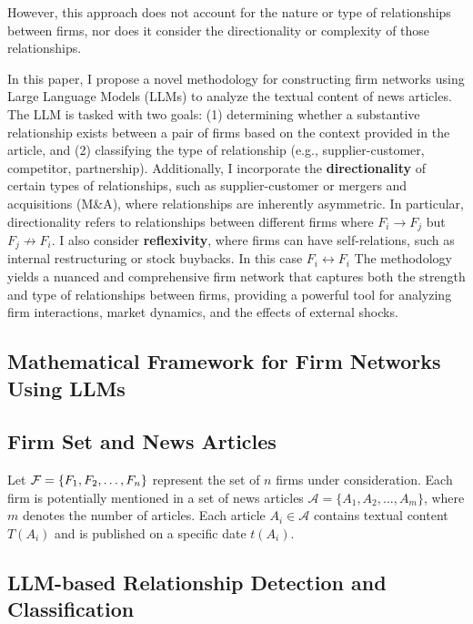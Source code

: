However, this approach does not account for the nature or type of relationships between firms, nor does it consider the directionality or complexity of those relationships.

In this paper, I propose a novel methodology for constructing firm networks using Large Language Models (LLMs) to analyze the textual content of news articles. The LLM is tasked with two goals: (1) determining whether a substantive relationship exists between a pair of firms based on the context provided in the article, and (2) classifying the type of relationship (e.g., supplier-customer, competitor, partnership). Additionally, I incorporate the \textbf{directionality} of certain types of relationships, such as supplier-customer or mergers and acquisitions (M\&A), where relationships are inherently asymmetric. In particular, directionality refers to relationships between different firms where $F_i \rightarrow F_j$ but $F_j \not \rightarrow F_i$. I also consider \textbf{reflexivity}, where firms can have self-relations, such as internal restructuring or stock buybacks. In this case $F_i \leftrightarrow F_i$
The methodology yields a nuanced and comprehensive firm network that captures both the strength and type of relationships between firms, providing a powerful tool for analyzing firm interactions, market dynamics, and the effects of external shocks.

\subsection{Mathematical Framework for Firm Networks Using LLMs}

\subsection{Firm Set and News Articles}

Let $ \mathcal{F} = \{F_1, F_2, \dots, F_n\} $ represent the set of $ n $ firms under consideration. Each firm is potentially mentioned in a set of news articles $ \mathcal{A} = \{A_1, A_2, \dots, A_m\} $, where $ m $ denotes the number of articles. Each article $ A_i \in \mathcal{A} $ contains textual content $ T(A_i) $ and is published on a specific date $ t(A_i) $.

\subsection{LLM-based Relationship Detection and Classification}

